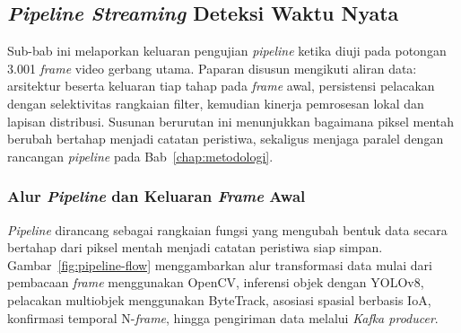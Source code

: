 \subsection{\textit{Pipeline Streaming} Deteksi Waktu Nyata}
\label{subsec:hasil-pipeline}

Sub-bab ini melaporkan keluaran pengujian \textit{pipeline} ketika diuji pada potongan 3.001 \textit{frame} video gerbang utama. Paparan disusun mengikuti aliran data: arsitektur beserta keluaran tiap tahap pada \textit{frame} awal, persistensi pelacakan dengan selektivitas rangkaian filter, kemudian kinerja pemrosesan lokal dan lapisan distribusi. Susunan berurutan ini menunjukkan bagaimana piksel mentah berubah bertahap menjadi catatan peristiwa, sekaligus menjaga paralel dengan rancangan \textit{pipeline} pada Bab~\ref{chap:metodologi}.

\subsubsection{Alur \textit{Pipeline} dan Keluaran \textit{Frame} Awal}
\label{subsubsec:hasil-arsitektur}

\textit{Pipeline} dirancang sebagai rangkaian fungsi yang mengubah bentuk data secara bertahap dari piksel mentah menjadi catatan peristiwa siap simpan. Gambar~\ref{fig:pipeline-flow} menggambarkan alur transformasi data mulai dari pembacaan \textit{frame} menggunakan OpenCV, inferensi objek dengan YOLOv8, pelacakan multiobjek menggunakan ByteTrack, asosiasi spasial berbasis IoA, konfirmasi temporal N-\textit{frame}, hingga pengiriman data melalui \textit{Kafka producer}.

